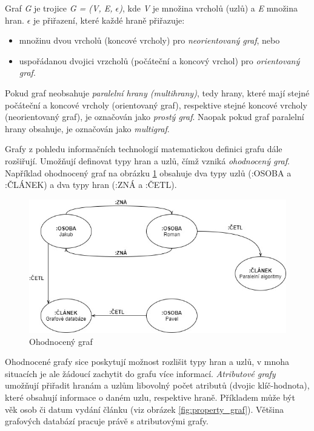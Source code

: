 Graf \textit{G} je trojice \textit{G = (V, E, $\epsilon$)}, kde \textit{V} je množina vrcholů (uzlů) a \textit{E} množina hran. \textit{$\epsilon$} je přiřazení, které každé hraně přiřazuje:
\begin{itemize}
	\item{} množinu dvou vrcholů (koncové vrcholy) pro \textit{neorientovaný graf}, nebo
	\item{} uspořádanou dvojici vrzcholů (počáteční a koncový vrchol) pro \textit{orientovaný graf}.
\end{itemize}

Pokud graf neobsahuje \textit{paralelní hrany (multihrany)}, tedy hrany, které mají stejné počáteční a koncové vrcholy (orientovaný graf), respektive stejné koncové vrcholy (neorientovaný graf), je označován jako \textit{prostý graf}. Naopak pokud graf paralelní hrany obsahuje, je označován jako \textit{multigraf}.\cite{Demlova17}

Grafy z pohledu informačních technologií matematickou definici grafu dále rozšiřují. Umožňují definovat typy hran a uzlů, čímž vzniká \textit{ohodnocený graf}. Například ohodnocený graf na obrázku \ref{fig:labeled_graf} obsahuje dva typy uzlů (:OSOBA a :ČLÁNEK) a dva typy hran (:ZNÁ a :ČETL).

\begin{figure}
\begin{center}
\includegraphics[width=12cm]{figures/labeled_graph}
\caption{Ohodnocený graf}
\label{fig:labeled_graf}
\end{center}
\end{figure}

Ohodnocené grafy sice poskytují možnost rozlišit typy hran a uzlů, v mnoha situacích je ale žádoucí zachytit do grafu více informací. \textit{Atributové grafy} umožňují přiřadit hranám a uzlům libovolný počet atributů (dvojic klíč-hodnota), které obsahují informace o daném uzlu, respektive hraně. Příkladem může být věk osob či datum vydání článku (viz obrázek \ref{fig:property_graf}). Většina grafových databází pracuje právě s atributovými grafy.\cite{Lal15}

